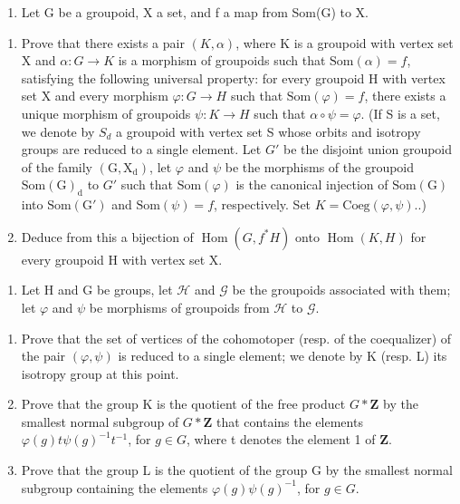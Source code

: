 \exercisegroup

\begin{enumerate}
\def\labelenumi{\arabic{enumi})}
\tightlist
\item
  Let G be a groupoid, X a set, and f a map from Som(G) to X.
\end{enumerate}

\begin{enumerate}
\def\labelenumi{\alph{enumi})}
\item
  Prove that there exists a pair \((K,\alpha)\), where K is a groupoid with vertex set X and \(\alpha: G \rightarrow K\) is a morphism of groupoids such that \(\mathrm{Som}(\alpha)=f\), satisfying the following universal property: for every groupoid H with vertex set X and every morphism \(\varphi:G\to H\) such that \(\mathrm{Som}(\varphi)=f\), there exists a unique morphism of groupoids \(\psi:K\to H\) such that \(\alpha\circ\psi=\varphi\). (If S is a set, we denote by \(S_{d}\) a groupoid with vertex set S whose orbits and isotropy groups are reduced to a single element. Let \(G'\) be the disjoint union groupoid of the family \((\mathrm{G},\mathrm{X}_{\mathrm{d}})\), let \(\varphi\) and \(\psi\) be the morphisms of the groupoid \(\mathrm{Som}(\mathrm{G})_{\mathrm{d}}\) to \(G'\) such that \(\mathrm{Som}(\varphi)\) is the canonical injection of \(\mathrm{Som}(\mathrm{G})\) into \(\mathrm{Som}(\mathrm{G}')\) and \(\mathrm{Som}(\psi)=f\), respectively. Set \(K=\mathrm{Coeg}(\varphi,\psi).\).)
\item
  Deduce from this a bijection of \(\operatorname{Hom}(G, f^{*}H)\) onto \(\operatorname{Hom}(K, H)\) for every groupoid H with vertex set X.
\end{enumerate}

\begin{enumerate}
\def\labelenumi{\arabic{enumi})}
\setcounter{enumi}{1}
\tightlist
\item
  Let H and G be groups, let \(\mathcal{H}\) and \(\mathcal{G}\) be the groupoids associated with them; let \(\varphi\) and \(\psi\) be morphisms of groupoids from \(\mathcal{H}\) to \(\mathcal{G}\).
\end{enumerate}

\begin{enumerate}
\def\labelenumi{\alph{enumi})}
\item
  Prove that the set of vertices of the cohomotoper (resp. of the coequalizer) of the pair \((\varphi,\psi)\) is reduced to a single element; we denote by K (resp. L) its isotropy group at this point.
\item
  Prove that the group K is the quotient of the free product \(G * \mathbf{Z}\) by the smallest normal subgroup of \(G * \mathbf{Z}\) that contains the elements \(\varphi(g)t\psi(g)^{-1}t^{-1}\), for \(g \in G\), where t denotes the element 1 of \(\mathbf{Z}\).
\item
  Prove that the group L is the quotient of the group G by the smallest normal subgroup containing the elements \(\varphi(g)\psi(g)^{-1}\), for \(g \in G\).
\end{enumerate}

